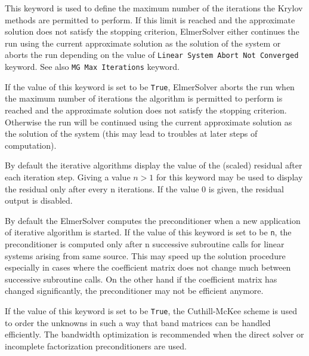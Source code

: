 This keyword is used to define the maximum number of the iterations the Krylov methods
are permitted to perform. 
If this limit is reached and the approximate solution does not satisfy the stopping criterion, 
ElmerSolver either continues the run using the current approximate solution as the solution
of the system or aborts the run depending on the value of {\tt Linear System Abort Not Converged}
keyword. See also {\tt MG Max Iterations} keyword.

If the value of this keyword is set to be {\tt True}, ElmerSolver aborts the run when
the maximum number of iterations the algorithm is permitted to perform is reached and 
the approximate solution does not satisfy the stopping criterion. 
Otherwise the run will be continued using the current approximate solution as the solution of 
the system (this may lead to troubles at later steps of computation).  

By default the iterative algorithms display the value of the (scaled) residual after each 
iteration step. Giving a value $n>1$ for this keyword may be used 
to display the residual only after every n iterations. If the value 0 is given, the residual output 
is disabled.

By default the ElmerSolver computes the preconditioner when a new application of iterative
algorithm is started. If the value of this keyword is set to be {\tt n}, 
the preconditioner is computed only 
after n successive subroutine calls for linear systems arising from same source.
This may speed up the solution procedure especially in cases where the coefficient matrix does
not change much between successive subroutine calls. On the other hand if the coefficient matrix has changed 
significantly, the preconditioner may not be efficient anymore.

If the value of this keyword is set to be {\tt True}, 
the Cuthill-McKee  scheme is used to order the unknowns
in such a way that band matrices can be handled efficiently. 
The bandwidth optimization is recommended when the direct solver or incomplete factorization 
preconditioners are used.

